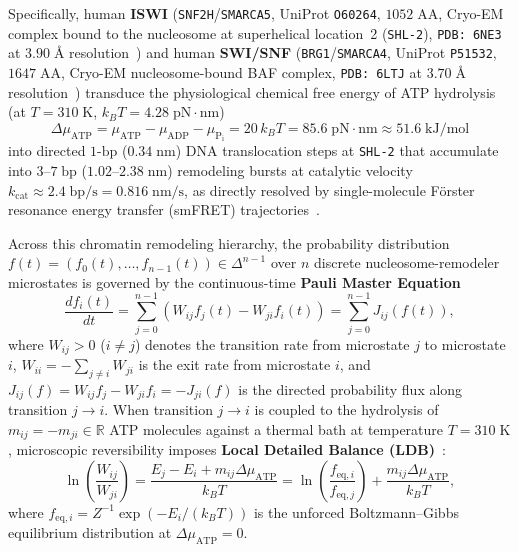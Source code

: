 \documentclass[11pt,a4paper]{article}
\theoremstyle{definition}
\begin{document}
Specifically, human \textbf{ISWI} (\texttt{SNF2H}/\texttt{SMARCA5}, UniProt \texttt{O60264}, $1052\;\mathrm{AA}$, Cryo-EM complex bound to the nucleosome at superhelical location~2 (\texttt{SHL-2}), \texttt{PDB: 6NE3} at $3.90\;\text{\AA}$ resolution~\cite{Armache2019}) and human \textbf{SWI/SNF} (\texttt{BRG1}/\texttt{SMARCA4}, UniProt \texttt{P51532}, $1647\;\mathrm{AA}$, Cryo-EM nucleosome-bound BAF complex, \texttt{PDB: 6LTJ} at $3.70\;\text{\AA}$ resolution~\cite{He2020}) transduce the physiological chemical free energy of ATP hydrolysis (at $T = 310\;\mathrm{K}$, $k_B T = 4.28\;\mathrm{pN\cdot nm}$)
\begin{equation}
  \Delta\mu_{\mathrm{ATP}} = \mu_{\mathrm{ATP}} - \mu_{\mathrm{ADP}} - \mu_{\mathrm{P_i}} = 20\,k_B T = 85.6\;\mathrm{pN\cdot nm} \approx 51.6\;\mathrm{kJ/mol}
\end{equation}
into directed $1\text{-bp}$ ($0.34\;\mathrm{nm}$) DNA translocation steps at \texttt{SHL-2} that accumulate into $3\text{--}7\;\mathrm{bp}$ ($1.02\text{--}2.38\;\mathrm{nm}$) remodeling bursts at catalytic velocity $k_{\mathrm{cat}} \approx 2.4\;\mathrm{bp/s} = 0.816\;\mathrm{nm/s}$, as directly resolved by single-molecule F\"orster resonance energy transfer (smFRET) trajectories~\cite{Blosser2009,Deindl2013}.

Across this chromatin remodeling hierarchy, the probability distribution $f(t) = (f_0(t), \dots, f_{n-1}(t)) \in \Delta^{n-1}$ over $n$ discrete nucleosome-remodeler microstates is governed by the continuous-time \textbf{Pauli Master Equation}~\cite{Schnakenberg1976,Julicher1997,Seifert2012}
\begin{equation}
  \frac{df_i(t)}{dt} = \sum_{j=0}^{n-1} \left(W_{ij} f_j(t) - W_{ji} f_i(t)\right) = \sum_{j=0}^{n-1} J_{ij}(f(t)),
\end{equation}
where $W_{ij} > 0$ ($i \ne j$) denotes the transition rate from microstate $j$ to microstate $i$, $W_{ii} = -\sum_{j \ne i} W_{ji}$ is the exit rate from microstate $i$, and $J_{ij}(f) = W_{ij}f_j - W_{ji}f_i = -J_{ji}(f)$ is the directed probability flux along transition $j \to i$. When transition $j \to i$ is coupled to the hydrolysis of $m_{ij} = -m_{ji} \in \mathbb{R}$ ATP molecules against a thermal bath at temperature $T = 310\;\mathrm{K}$, microscopic reversibility imposes \textbf{Local Detailed Balance (LDB)}~\cite{Seifert2012,EspositoVanDenBroeck2010}:
\begin{equation}
  \ln\!\left(\frac{W_{ij}}{W_{ji}}\right) = \frac{E_j - E_i + m_{ij}\Delta\mu_{\mathrm{ATP}}}{k_B T} = \ln\!\left(\frac{f_{\mathrm{eq},i}}{f_{\mathrm{eq},j}}\right) + \frac{m_{ij}\Delta\mu_{\mathrm{ATP}}}{k_B T},
\end{equation}
where $f_{\mathrm{eq},i} = Z^{-1}\exp(-E_i/(k_B T))$ is the unforced Boltzmann--Gibbs equilibrium distribution at $\Delta\mu_{\mathrm{ATP}} = 0$.
\end{document}
